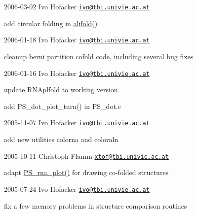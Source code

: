 2006-\/03-\/02 Ivo Hofacker \href{mailto:ivo@tbi.univie.ac.at}{\tt ivo@tbi.\+univie.\+ac.\+at}


\begin{DoxyItemize}
\item add circular folding in \hyperlink{group__consensus__mfe__fold_ga4cf00f0659e5f0480335d69e797f05b1}{alifold()}
\end{DoxyItemize}

2006-\/01-\/18 Ivo Hofacker \href{mailto:ivo@tbi.univie.ac.at}{\tt ivo@tbi.\+univie.\+ac.\+at}


\begin{DoxyItemize}
\item cleanup berni partition cofold code, including several bug fixes
\end{DoxyItemize}

2006-\/01-\/16 Ivo Hofacker \href{mailto:ivo@tbi.univie.ac.at}{\tt ivo@tbi.\+univie.\+ac.\+at}


\begin{DoxyItemize}
\item update R\+N\+Aplfold to working version
\item add P\+S\+\_\+dot\+\_\+plot\+\_\+turn() in P\+S\+\_\+dot.\+c
\end{DoxyItemize}

2005-\/11-\/07 Ivo Hofacker \href{mailto:ivo@tbi.univie.ac.at}{\tt ivo@tbi.\+univie.\+ac.\+at}


\begin{DoxyItemize}
\item add new utilities colorna and coloraln
\end{DoxyItemize}

2005-\/10-\/11 Christoph Flamm \href{mailto:xtof@tbi.univie.ac.at}{\tt xtof@tbi.\+univie.\+ac.\+at}


\begin{DoxyItemize}
\item adapt \hyperlink{plot__structure_8h_a0873c7cc4cd7a11c9a2cea19dde7e9c9}{P\+S\+\_\+rna\+\_\+plot()} for drawing co-\/folded structures
\end{DoxyItemize}

2005-\/07-\/24 Ivo Hofacker \href{mailto:ivo@tbi.univie.ac.at}{\tt ivo@tbi.\+univie.\+ac.\+at}


\begin{DoxyItemize}
\item fix a few memory problems in structure comparison routines
\end{DoxyItemize}

